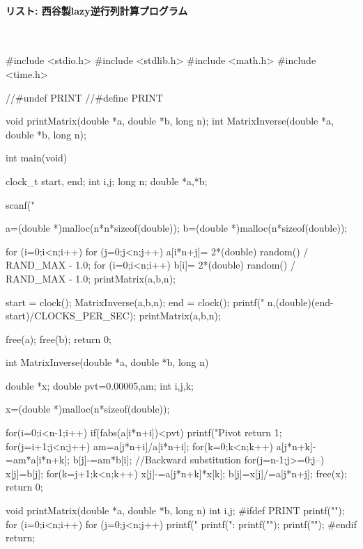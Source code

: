 \paragraph{リスト: 西谷製lazy逆行列計算プログラム}　
\begin{MapleInput}
#include <stdio.h>
#include <stdlib.h>
#include <math.h>
#include <time.h>

//#undef PRINT
//#define PRINT

void printMatrix(double *a, double *b, long n);
int MatrixInverse(double *a, double *b, long n);

int main(void){
  clock_t start, end;
  int i,j;
  long n;
  double *a,*b;

  scanf("%

  a=(double *)malloc(n*n*sizeof(double));
  b=(double *)malloc(n*sizeof(double));

  for (i=0;i<n;i++){
    for (j=0;j<n;j++){
      a[i*n+j]= 2*(double) random() / RAND_MAX - 1.0;
    }
  }
  for (i=0;i<n;i++){
    b[i]= 2*(double) random() / RAND_MAX - 1.0;
  }
  printMatrix(a,b,n);

  start = clock();
  MatrixInverse(a,b,n);
  end = clock();
  printf("%
	 n,(double)(end-start)/CLOCKS_PER_SEC);
  printMatrix(a,b,n);

  free(a);
  free(b);
  return 0;
}

int MatrixInverse(double *a, double *b, long n){
  double *x;
  double pvt=0.00005,am;
  int i,j,k;

  x=(double *)malloc(n*sizeof(double));

  for(i=0;i<n-1;i++){
    if(fabs(a[i*n+i])<pvt){
      printf("Pivot %
      return 1;
    }
    for(j=i+1;j<n;j++){
      am=a[j*n+i]/a[i*n+i];
      for(k=0;k<n;k++) a[j*n+k]-=am*a[i*n+k];
      b[j]-=am*b[i];
    }
  }
  //Backward substitution
  for(j=n-1;j>=0;j--){
    x[j]=b[j];
    for(k=j+1;k<n;k++){
      x[j]-=a[j*n+k]*x[k];
    }
    b[j]=x[j]/=a[j*n+j];
  }
  free(x);
  return 0;
}

void printMatrix(double *a, double *b, long n){
  int i,j;
#ifdef PRINT
  printf("\n");
  for (i=0;i<n;i++){
    for (j=0;j<n;j++){
      printf("%
    }
    printf(":%
    printf("\n");
  }
  printf("\n");
#endif
  return;
}
\end{MapleInput}



